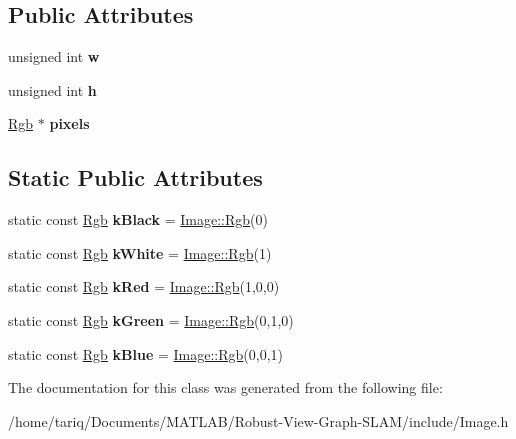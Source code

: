 \subsection*{Public Attributes}
\begin{DoxyCompactItemize}
\item 
unsigned int {\bfseries w}\hypertarget{classImage_ab543158db8f1e052304cf19bd16039fd}{}\label{classImage_ab543158db8f1e052304cf19bd16039fd}

\item 
unsigned int {\bfseries h}\hypertarget{classImage_a3df6171bcc6186a4598cba8062a63f3b}{}\label{classImage_a3df6171bcc6186a4598cba8062a63f3b}

\item 
\hyperlink{structImage_1_1Rgb}{Rgb} $\ast$ {\bfseries pixels}\hypertarget{classImage_adb981556f5bcd694863db42caecda726}{}\label{classImage_adb981556f5bcd694863db42caecda726}

\end{DoxyCompactItemize}
\subsection*{Static Public Attributes}
\begin{DoxyCompactItemize}
\item 
static const \hyperlink{structImage_1_1Rgb}{Rgb} {\bfseries k\+Black} = \hyperlink{structImage_1_1Rgb}{Image\+::\+Rgb}(0)\hypertarget{classImage_a3af1a2f15969cb91d7855dde1b1636fc}{}\label{classImage_a3af1a2f15969cb91d7855dde1b1636fc}

\item 
static const \hyperlink{structImage_1_1Rgb}{Rgb} {\bfseries k\+White} = \hyperlink{structImage_1_1Rgb}{Image\+::\+Rgb}(1)\hypertarget{classImage_a0d566dca18997bf5476b44533fd6f47e}{}\label{classImage_a0d566dca18997bf5476b44533fd6f47e}

\item 
static const \hyperlink{structImage_1_1Rgb}{Rgb} {\bfseries k\+Red} = \hyperlink{structImage_1_1Rgb}{Image\+::\+Rgb}(1,0,0)\hypertarget{classImage_a608a338f74b08734f178564054a0795a}{}\label{classImage_a608a338f74b08734f178564054a0795a}

\item 
static const \hyperlink{structImage_1_1Rgb}{Rgb} {\bfseries k\+Green} = \hyperlink{structImage_1_1Rgb}{Image\+::\+Rgb}(0,1,0)\hypertarget{classImage_a3fdac82511a82f222766220d4a9add8e}{}\label{classImage_a3fdac82511a82f222766220d4a9add8e}

\item 
static const \hyperlink{structImage_1_1Rgb}{Rgb} {\bfseries k\+Blue} = \hyperlink{structImage_1_1Rgb}{Image\+::\+Rgb}(0,0,1)\hypertarget{classImage_a4da8b48b3fc304a8e17f591e58b44afb}{}\label{classImage_a4da8b48b3fc304a8e17f591e58b44afb}

\end{DoxyCompactItemize}


The documentation for this class was generated from the following file\+:\begin{DoxyCompactItemize}
\item 
/home/tariq/\+Documents/\+M\+A\+T\+L\+A\+B/\+Robust-\/\+View-\/\+Graph-\/\+S\+L\+A\+M/include/Image.\+h\end{DoxyCompactItemize}
